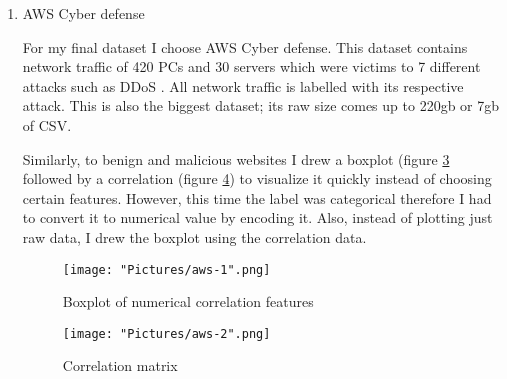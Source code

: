 \documentclass[11pt]{article}
\begin{document}
\begin{enumerate}
\begin{figure}[h!]
   \texttt{[image: "Pictures/malicious-benign-websites-1".png]}
   \caption{Boxplot of numerical features}
   \label{fig:websites-boxplot}
\end{figure}

  I also drew a correlation graph (figure \ref{fig:websites-corre}) since it can easily show what attributes are responsible for indicating that a website is malicious or not. However, its normally a set of features that indicate whether a website is malicious or not, not just one. Unforunately the correlation graph is unable to show this.

\begin{figure}[t!]
   \texttt{[image: "Pictures/malicious-benign-websites-2".png]}
   \caption{Correlation matrix}
   \label{fig:websites-corre}
\end{figure}

\newpage
  \item{AWS Cyber defense }
  
  For my final dataset I choose AWS Cyber defense. This dataset contains network traffic of 420 PCs and 30 servers which were victims to 7 different attacks such as DDoS \cite{bg-dataset-aws}. All network traffic is labelled with its respective attack. This is also the biggest dataset; its raw size comes up to 220gb or 7gb of CSV. 

  Similarly, to benign and malicious websites I drew a boxplot (figure \ref{fig:aws-boxplot} followed by a correlation (figure \ref{fig:aws-corre}) to visualize it quickly instead of choosing certain features. However, this time the label was categorical therefore I had to convert it to numerical value by encoding it. Also, instead of plotting just raw data, I drew the boxplot using the correlation data. 

\begin{figure}[t!]
   \texttt{[image: "Pictures/aws-1".png]}
   \caption{Boxplot of numerical correlation features}
   \label{fig:aws-boxplot}
\end{figure}

\begin{figure}[p!]
   \texttt{[image: "Pictures/aws-2".png]}
   \caption{Correlation matrix}
   \label{fig:aws-corre}
\end{figure}
\end{enumerate}
\end{document}
